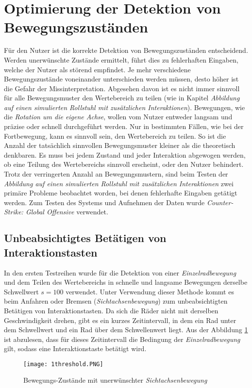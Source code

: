 \section{Optimierung der Detektion von Bewegungszuständen}
Für den Nutzer ist die korrekte Detektion von Bewegungszuständen entscheidend.
Werden unerwünschte Zustände ermittelt, führt dies zu fehlerhaften Eingaben, welche der Nutzer als störend empfindet.
Je mehr verschiedene Bewegungszustände voneinander unterschieden werden müssen, desto höher ist die Gefahr der Missinterpretation.
Abgesehen davon ist es nicht immer sinnvoll für alle Bewegungsmuster den Wertebereich zu teilen (wie in Kapitel \textit{Abbildung auf einen simulierten Rollstuhl mit zusätzlichen Interaktionen}).
Bewegungen, wie die \textit{Rotation um die eigene Achse}, wollen vom Nutzer entweder langsam und präzise oder schnell durchgeführt werden.
Nur in bestimmten Fällen, wie bei der Fortbewegung, kann es sinnvoll sein, den Wertebereich zu teilen.
So ist die Anzahl der tatsächlich sinnvollen Bewegungsmuster kleiner als die theoretisch denkbaren.
Es muss bei jedem Zustand und jeder Interaktion abgewogen werden, ob eine Teilung des Wertebereichs sinnvoll erscheint, oder den Nutzer behindert.
Trotz der verringerten Anzahl an Bewegungsmustern, sind beim Testen der \textit{Abbildung auf einen simulierten Rollstuhl mit zusätzlichen Interaktionen} zwei primäre Probleme beobachtet worden, bei denen fehlerhafte Eingaben getätigt werden.
Zum Testen des Systems und Aufnehmen der Daten wurde \textit{Counter-Strike: Global Offensive} verwendet.

\subsection{Unbeabsichtigtes Betätigen von Interaktionstasten}
In den ersten Testreihen wurde für die Detektion von einer \textit{Einzelradbewegung} und dem Teilen des Wertebereichs in schnelle und langsame Bewegungen derselbe Schwellwert $s = 100$ verwendet.
Unter Verwendung dieser Methode kommt es beim Anfahren oder Bremsen (\textit{Sichtachsenbewegung}) zum unbeabsichtigten Betätigen von Interaktionstasten.
Da sich die Räder nicht mit derselben Geschwindigkeit drehen, gibt es ein kurzes Zeitintervall, in dem ein Rad unter dem Schwellwert und ein Rad über dem Schwellenwert liegt.
Aus der Abbildung \ref{fig:1_threshold} ist abzulesen, dass für dieses Zeitintervall die Bedingung der \textit{Einzelradbewegung} gilt, sodass eine Interaktionstaste betätigt wird.

\begin{figure}[h]
    \centering
    \texttt{[image: 1threshold.PNG]}
    \caption{Bewegungs-Zustände mit unerwünschter \textit{Sichtachsenbewegung}}
    \label{fig:1_threshold}
\end{figure}

